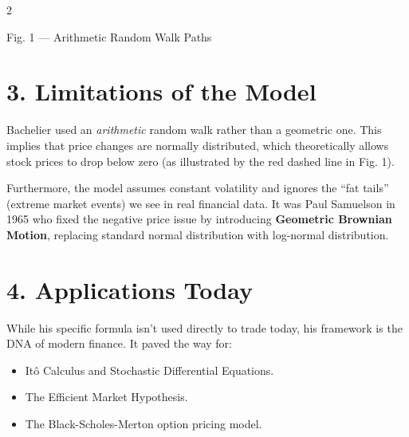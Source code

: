 \documentclass[a4paper,10.5pt]{article}
\begin{document}
\begin{multicols}{2}
\begin{center}
\end{center}
\centerline{\tiny\color{muted} Fig. 1 — Arithmetic Random Walk Paths}

\section*{3. Limitations of the Model}
Bachelier used an \textit{arithmetic} random walk rather than a geometric one. This implies that price changes are normally distributed, which theoretically allows stock prices to drop below zero (as illustrated by the red dashed line in Fig. 1). 

Furthermore, the model assumes constant volatility and ignores the ``fat tails'' (extreme market events) we see in real financial data. It was Paul Samuelson in 1965 who fixed the negative price issue by introducing \textbf{Geometric Brownian Motion}, replacing standard normal distribution with log-normal distribution.

\section*{4. Applications Today}
While his specific formula isn't used directly to trade today, his framework is the DNA of modern finance. It paved the way for:
\begin{itemize}[leftmargin=12pt, itemsep=2pt, topsep=3pt]
    \item[\textcolor{accent}{$\blacksquare$}] Itô Calculus and Stochastic Differential Equations.
    \item[\textcolor{accent}{$\blacksquare$}] The Efficient Market Hypothesis.
    \item[\textcolor{accent}{$\blacksquare$}] The Black-Scholes-Merton option pricing model.
\end{itemize}


\end{multicols}
\end{document}
